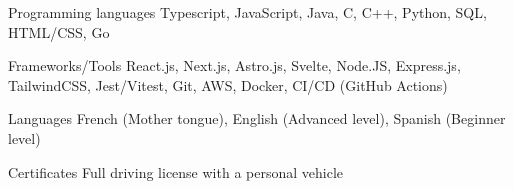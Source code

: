 
\begin{cvskills}
  \cvskill
    {Programming languages} %
    {Typescript, JavaScript, Java, C, C++, Python, SQL, HTML/CSS, Go} %

  \cvskill
    {Frameworks/Tools} %
    {React.js, Next.js, Astro.js, Svelte, Node.JS, Express.js, TailwindCSS, Jest/Vitest, Git, AWS, Docker, CI/CD (GitHub Actions)} %
    
  \cvskill
    {Languages} %
    {French (Mother tongue), English (Advanced level), Spanish (Beginner level)} %
    
  \cvskill
    {Certificates} %
    {Full driving license with a personal vehicle} %
\end{cvskills}
